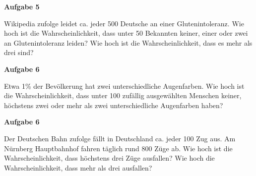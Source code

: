 \documentclass[a4paper,12pt]{article}
\newcommand{\Aufgabe}[1]{
  {
  \vspace*{0.5cm}
  \textsf{\textbf{Aufgabe #1}}
  \vspace*{0.2cm}
  
  }
}
\begin{document}
\Aufgabe{5}
Wikipedia zufolge leidet ca. jeder 500 Deutsche an einer Glutenintoleranz. Wie hoch ist die Wahrscheinlichkeit, dass unter 50 Bekannten keiner, einer oder zwei an Glutenintoleranz leiden? Wie hoch ist die Wahrscheinlichkeit, dass es mehr als drei sind?

\Aufgabe{6}
Etwa 1\% der Bevölkerung hat zwei unterschiedliche Augenfarben. Wie hoch ist die Wahrscheinlichkeit, dass unter 100 zufällig ausgewählten Menschen keiner, höchstens zwei oder mehr als zwei unterschiedliche Augenfarben haben?


\Aufgabe{6}
Der Deutschen Bahn zufolge fällt in Deutschland ca. jeder 100 Zug aus. Am Nürnberg Hauptbahnhof fahren täglich rund 800 Züge ab. Wie hoch ist die Wahrscheinlichkeit, dass höchstens drei Züge ausfallen? Wie hoch die Wahrscheinlichkeit, dass mehr als drei ausfallen?

\end{document}
